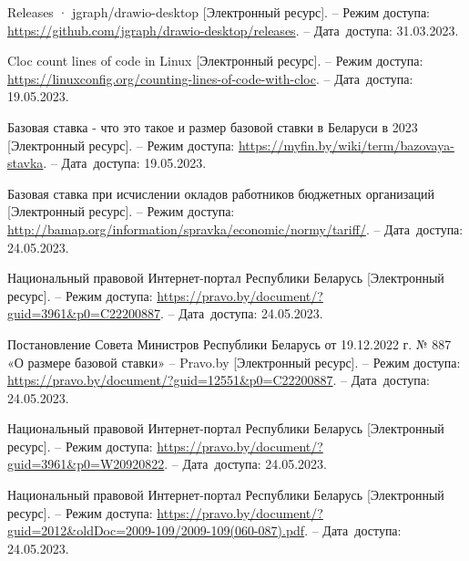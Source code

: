 \begin{thebibliography}{}
    Releases · jgraph/drawio-desktop
    [Электронный ресурс].
    -- Режим доступа: \url{https://github.com/jgraph/drawio-desktop/releases}.
    -- Дата~доступа: 31.03.2023.

    Cloc count lines of code in Linux
    [Электронный ресурс].
    -- Режим доступа: \url{https://linuxconfig.org/counting-lines-of-code-with-cloc}.
    -- Дата~доступа: 19.05.2023.

    Базовая ставка - что это такое и размер базовой ставки в Беларуси в 2023
    [Электронный ресурс].
    -- Режим доступа: \url{https://myfin.by/wiki/term/bazovaya-stavka}.
    -- Дата~доступа: 19.05.2023.

    Базовая ставка при исчислении окладов работников бюджетных организаций
    [Электронный ресурс].
    -- Режим доступа: \url{http://bamap.org/information/spravka/economic/normy/tariff/}.
    -- Дата~доступа: 24.05.2023.

    Национальный правовой Интернет-портал Республики Беларусь
    [Электронный ресурс].
    -- Режим доступа: \url{https://pravo.by/document/?guid=3961&p0=C22200887}.
    -- Дата~доступа: 24.05.2023.

    Постановление Совета Министров Республики Беларусь от 19.12.2022 г. № 887 «О размере базовой ставки» – Pravo.by
    [Электронный ресурс].
    -- Режим доступа: \url{https://pravo.by/document/?guid=12551&p0=C22200887}.
    -- Дата~доступа: 24.05.2023.

    Национальный правовой Интернет-портал Республики Беларусь
    [Электронный ресурс].
    -- Режим доступа: \url{https://pravo.by/document/?guid=3961&p0=W20920822}.
    -- Дата~доступа: 24.05.2023.

    Национальный правовой Интернет-портал Республики Беларусь
    [Электронный ресурс].
    -- Режим доступа: \url{https://pravo.by/document/?guid=2012&oldDoc=2009-109/2009-109(060-087).pdf}.
    -- Дата~доступа: 24.05.2023.



\end{thebibliography}
